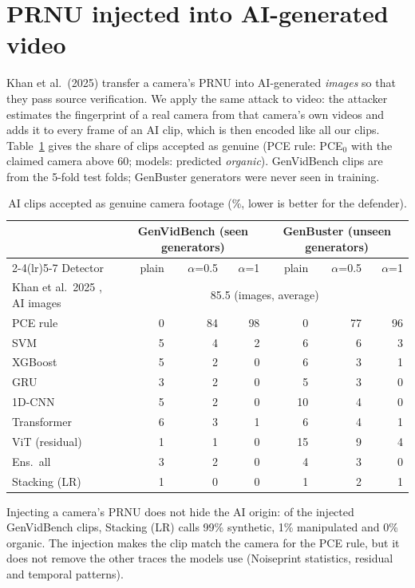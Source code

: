 \documentclass[11pt,a4paper]{article}
\begin{document}
\section{PRNU injected into AI-generated video}
Khan et al.\ (2025) transfer a camera's PRNU into AI-generated \emph{images} so that they pass source verification. We apply the same attack to video: the attacker estimates the fingerprint of a real camera from that camera's own videos and adds it to every frame of an AI clip, which is then encoded like all our clips. Table~\ref{tab:khanai} gives the share of clips accepted as genuine (PCE rule: PCE$_0$ with the claimed camera above 60; models: predicted \emph{organic}). GenVidBench clips are from the 5-fold test folds; GenBuster generators were never seen in training.
\begin{table}[H]\centering\small\caption{AI clips accepted as genuine camera footage (\%, lower is better for the defender).}\label{tab:khanai}\begin{tabular}{lrrrrrr}\toprule & \multicolumn{3}{c}{GenVidBench (seen generators)} & \multicolumn{3}{c}{GenBuster (unseen generators)} \\\cmidrule(lr){2-4}\cmidrule(lr){5-7} Detector & plain & $\alpha$=0.5 & $\alpha$=1 & plain & $\alpha$=0.5 & $\alpha$=1 \\\midrule
Khan et al.~2025 \cite{khan2025}, AI images & \multicolumn{6}{c}{85.5 (images, average)} \\\midrule
PCE rule & 0 & 84 & 98 & 0 & 77 & 96 \\
SVM & 5 & 4 & 2 & 6 & 6 & 3 \\
XGBoost & 5 & 2 & 0 & 6 & 3 & 1 \\
GRU & 3 & 2 & 0 & 5 & 3 & 0 \\
1D-CNN & 5 & 2 & 0 & 10 & 4 & 0 \\
Transformer & 6 & 3 & 1 & 6 & 4 & 1 \\
ViT (residual) & 1 & 1 & 0 & 15 & 9 & 4 \\
Ens.\ all & 3 & 2 & 0 & 4 & 3 & 0 \\
Stacking (LR) & 1 & 0 & 0 & 1 & 2 & 1 \\
\bottomrule\end{tabular}\end{table}
Injecting a camera's PRNU does not hide the AI origin: of the injected GenVidBench clips, Stacking (LR) calls 99\% synthetic, 1\% manipulated and 0\% organic. The injection makes the clip match the camera for the PCE rule, but it does not remove the other traces the models use (Noiseprint statistics, residual and temporal patterns).
\end{document}
